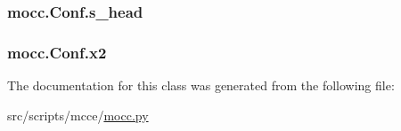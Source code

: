 \hypertarget{classmocc_1_1_conf_a1bd6811ef470dd12245b214c639c50d5}{
\subsubsection[{s\-\_\-head}]{\setlength{\rightskip}{0pt plus 5cm}mocc.\-Conf.\-s\-\_\-head}}\label{classmocc_1_1_conf_a1bd6811ef470dd12245b214c639c50d5}
\hypertarget{classmocc_1_1_conf_a1a614c66d33ebd31d4f1493c90ca5ff5}{
\subsubsection[{x2}]{\setlength{\rightskip}{0pt plus 5cm}mocc.\-Conf.\-x2}}\label{classmocc_1_1_conf_a1a614c66d33ebd31d4f1493c90ca5ff5}


The documentation for this class was generated from the following file\-:\begin{DoxyCompactItemize}
\item 
src/scripts/mcce/\hyperlink{mocc_8py}{mocc.\-py}\end{DoxyCompactItemize}
